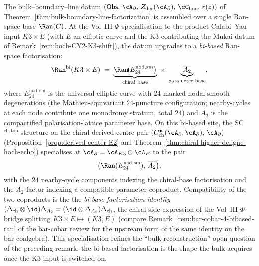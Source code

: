 \begin{remark}
\label{rem:hoch-bibased-Ran}
%
%
The bulk--boundary--line datum
$(\mathsf{Obs},\,\cA_\partial,\,Z_{\mathrm{der}}(\cA_\partial),\,
\cC_{\mathrm{line}},\,r(z))$ of
Theorem~\ref{thm:bulk-boundary-line-factorization} is assembled
over a single Ran-space base $\Ran(C)$. At the Vol~III
$\Phi$-specialisation to the product Calabi--Yau input $K3\times E$
(with $E$ an elliptic curve and the K3 contributing the Mukai datum
of Remark~\ref{rem:hoch-CY2-K3-shift}), the datum upgrades to a
\emph{bi-based} Ran-space factorisation:
\[
\Ran^{\mathrm{bi}}(K3\times E)
\;=\;
\underbrace{\Ran\!\bigl(E^{\mathrm{nod,sm}}_{24}\bigr)}_{\text{chiral
base}}
\;\times\;
\underbrace{\overline{A_2}}_{\text{parameter base}},
\]
where $E^{\mathrm{nod,sm}}_{24}$ is the universal elliptic curve with
$24$ marked nodal-smooth degenerations (the Mathieu-equivariant
$24$-puncture configuration; nearby-cycles at each node
contribute one monodromy stratum, total $24$) and $\overline{A_2}$ is
the compactified polarisation-lattice parameter base. On this
bi-based site, the SC$^{\mathrm{ch,top}}$-structure on the chiral
derived-centre pair
$(C^\bullet_{\mathrm{ch}}(\cA_\partial,\cA_\partial),\,\cA_\partial)$
(Proposition~\ref{prop:derived-center-E2} and
Theorem~\ref{thm:chiral-higher-deligne-hoch-echo}) specialises at
$\cA_\partial=\cA_{K3}\otimes\cA_E$ to the pair
\[
\bigl(\Ran(E^{\mathrm{nod,sm}}_{24}),\,\overline{A_2}\bigr),
\]
with the $24$ nearby-cycle components indexing the chiral-base
factorisation and the $\overline{A_2}$-factor indexing a compatible
parameter coproduct. Compatibility of the two coproducts is the
the \emph{bi-base factorisation identity}
$(\Delta_{\mathrm{ch}}\otimes\id)\Delta_{A_2}
 =(\id\otimes\Delta_{A_2})\Delta_{\mathrm{ch}}$,
the chiral-side expression of the Vol~III $\Phi$-bridge splitting
$K3\times E \mapsto (K3, E)$
(compare Remark~\ref{rem:bar-cobar-4-bibased-ran} of the bar-cobar
review for the upstream form of the same identity on the bar
coalgebra). This specialisation refines the ``bulk-reconstruction''
open question of the preceding remark: the bi-based factorisation is
the shape the bulk acquires once the K3 input is switched on.
\end{remark}

